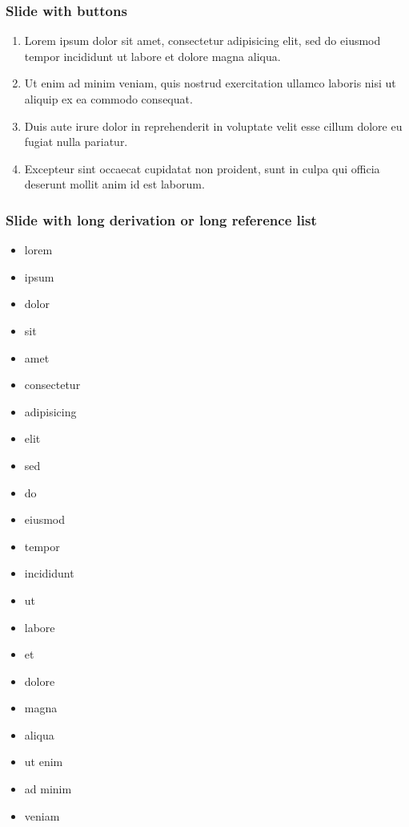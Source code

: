 \documentclass[11pt, xcolor={dvipsnames}, usepdftitle=false]{beamer}
\begin{document}
\begin{frame}[label=firstSlide]
\frametitle{Slide with buttons}
\begin{enumerate}
\item Lorem ipsum dolor sit amet, consectetur adipisicing elit, sed do eiusmod
tempor incididunt ut labore et dolore magna aliqua.
\item  Ut enim ad minim veniam, quis nostrud exercitation ullamco laboris nisi ut aliquip ex ea commodo consequat. 
\item Duis aute irure dolor in reprehenderit in voluptate velit esse
cillum dolore eu fugiat nulla pariatur. 
\item Excepteur sint occaecat cupidatat non proident, sunt in culpa qui officia deserunt mollit anim id est laborum.
\end{enumerate}
\hyperlink{backupSlide}{}
\hyperlink{anotherBackupSlide}{}
\end{frame}

\begin{frame}[allowframebreaks=0.8]
\frametitle{Slide with long derivation or long reference list}
\begin{itemize}
\item lorem 
\item ipsum 
\item dolor 
\item sit 
\item amet
\item consectetur 
\item adipisicing 
\item elit
\item sed
\item do
\item eiusmod
\item tempor
\item incididunt
\item ut
\item labore
\item et 
\item dolore 
\item magna 
\item aliqua
\item ut enim
\item ad minim 
\item veniam
\end{itemize}
\end{frame}
\end{document}
